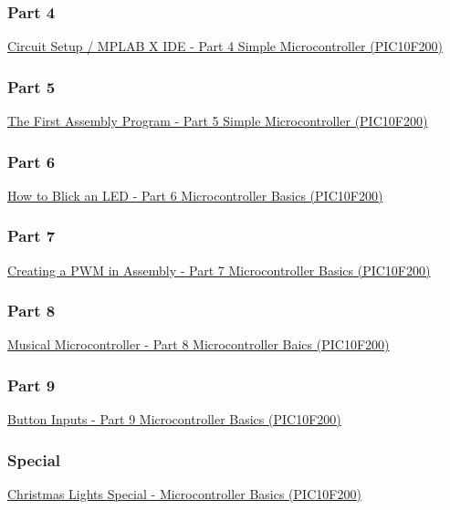 \documentclass[12pt, letterpaper]{article}
\begin{document}
\subsubsection{Part 4}
\href{https://www.circuitbread.com/tutorials/circuit-setup-mplab-x-ide-part-4-simple-microcontroller-pic10f200}{Circuit Setup / MPLAB X IDE  - Part 4 Simple Microcontroller (PIC10F200)}\\
\subsubsection{Part 5}
\href{https://www.circuitbread.com/tutorials/the-first-assembly-program-part-5-simple-microcontroller-pic10f200}{The First Assembly Program - Part 5 Simple Microcontroller (PIC10F200)}\\
\subsubsection{Part 6}
\href{https://www.circuitbread.com/tutorials/how-to-blink-an-led-part-6-microcontroller-basics-pic10f200}{How to Blick an LED - Part 6 Microcontroller Basics (PIC10F200)}\\
\subsubsection{Part 7}
\href{https://www.circuitbread.com/tutorials/pwm-led-dimming-part-7-microcontroller-basics-pic10f200}{Creating a PWM in Assembly - Part 7 Microcontroller Basics (PIC10F200)}\\
\subsubsection{Part 8}
\href{https://www.circuitbread.com/tutorials/musical-microcontroller-part-8-microcontroller-basics-pic10f200}{Musical Microcontroller - Part 8 Microcontroller Baics (PIC10F200)}\\
\subsubsection{Part 9}
\href{https://www.circuitbread.com/tutorials/button-inputs-part-9-microcontroller-basics-pic10f200?token=LmskE2t7648abpBhlu5zQP1KYlriMAeo}{Button Inputs - Part 9 Microcontroller Basics (PIC10F200)}\\
\subsubsection{Special}
\href{https://www.circuitbread.com/tutorials/christmas-lights-special-microcontroller-basics-pic10f200}{Christmas Lights Special - Microcontroller Basics (PIC10F200)}\\
\end{document}
